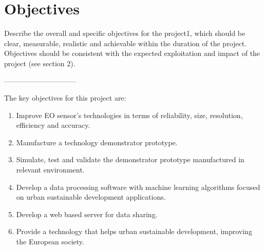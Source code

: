 \section{Objectives}

Describe the overall and specific objectives for the project1, which should be clear, measurable, realistic and achievable within the duration of the project. Objectives should be consistent with the expected exploitation and impact of the project (see section 2). 

------------------------------

The key objectives for this project are:

\begin{enumerate}

	\item Improve EO sensor's technologies in terms of reliability, size, resolution, efficiency and accuracy.

	\item Manufacture a technology demonstrator prototype.

	\item Simulate, test and validate the demonstrator prototype manufactured in relevant environment.

	\item Develop a data processing software with machine learning algorithms focused on urban sustainable development applications. 

	\item Develop a web based server for data sharing. 

	\item Provide a technology that helps urban sustainable development, improving the European society.
 
\end{enumerate}